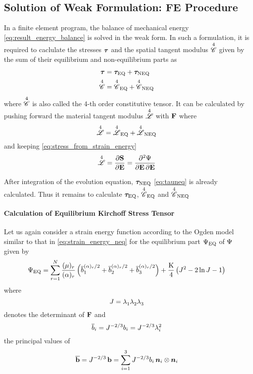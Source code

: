 \subsection{Solution of Weak Formulation: FE Procedure}
In a finite element program, the balance of mechanical energy \cref{eq:result_energy_balance} is solved in the weak form. In such a formulation, it is required to caclulate the stresses \(\bm{\tau}\) and the spatial tangent modulus \(\overset{4}{\mathscr{C}}\) given by the sum of their equilibrium and non-equilibrium parts as
\begin{align}
    \bm{\tau} &= \bm{\tau}_{\text{EQ}} + \bm{\tau}_{\text{NEQ}} \label{eq:tautot}\\
    \overset{4}{\mathscr{C}} &= {\overset{4}{\mathscr{C}}}_{\text{EQ}} + {\overset{4}{\mathscr{C}}}_{\text{NEQ}} \label{eq:Cmattot}
\end{align}
where \(\overset{4}{\mathscr{C}}\) is also called the 4-th order constitutive tensor. It can be calculated by pushing forward the material tangent modulus \(\overset{4}{\mathscr{L}}\) with \(\mathbf{F}\) where
\begin{equation}
    \overset{4}{\mathscr{L}} = {\overset{4}{\mathscr{L}}}_{\text{EQ}} + {\overset{4}{\mathscr{L}}}_{\text{NEQ}}
\end{equation}
and keeping \cref{eq:stress_from_strain_energy}
\begin{equation}
    \overset{4}{\mathscr{L}} = \pdv{\mathbf{S}}{\mathbf{E}} = \pdv{\Psi}{\mathbf{E}, \mathbf{E}}
\end{equation}

After integration of the evolution equation, \(\bm{\tau}_{\text{NEQ}}\) \cref{eq:tauneq} is already calculated. Thus it remains to calculate \(\bm{\tau}_{\text{EQ}}\), \({\overset{4}{\mathscr{C}}}_{\text{EQ}}\) and \({\overset{4}{\mathscr{C}}}_{\text{NEQ}}\)

\paragraph*{Calculation of Equilibrium Kirchoff Stress Tensor}
Let us again consider a strain energy function according to the Ogden model similar to that in \cref{eq:strain_energy_neq} for the equilibrium part \(\Psi_{\text{EQ}}\) of \(\Psi\) given by
\begin{equation}
    \Psi_{\text{EQ}} = \sum_{r=1}^{N} \frac{(\mu)_{r}}{(\alpha)_{r}}
     \left(\overline{b}_{{1}}^{(\alpha)_{r}/2} + \overline{b}_{{2}}^{(\alpha)_{r}/2} + \overline{b}_{{3}}^{(\alpha)_{r}/2}\right) 
     + \dfrac{\mathrm{K}}{4}\left( J^2 - 2 \ln J -1 \right)
     \label{eq:strain_energy_eq}
\end{equation}
where
\begin{equation}
    J = \lambda^{}_{{1}} \lambda^{}_{{2}} \lambda^{}_{{3}}
\end{equation}
denotes the determinant of \(\mathbf{F}\) and
\begin{equation}
    \overline{b}_{{i}} = J^{-2/3} b_{{i}} 
    = J^{-2/3} \lambda^{2}_{{i}}
    \label{eq:principal_b_dev}
\end{equation}
the principal values of 
\begin{equation}
    \mathbf{\overline{b}} = J^{-2/3} \, \mathbf{b} = \sum_{i=1}^{3} J^{-2/3} b_{{i}} \, \bm{n}_{i} \otimes \bm{n}_{i} 
\end{equation}


